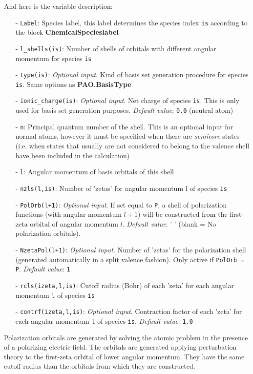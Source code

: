 \documentclass[11pt]{article}
\begin{document}
\begin{description}
\noindent
And here is the variable description:
\begin{itemize}
\item[-] {\tt Label}: Species label, this label determines 
the species index {\tt is} according to the block {\bf ChemicalSpecieslabel}
\item[-] {\tt l\_shells(is)}: Number of shells of orbitals 
with different angular momentum for species {\tt is}  
\item[-] {\tt type(is)}: {\it Optional input}.
Kind of basis set generation procedure for species {\tt is}. 
Same options as {\bf PAO.BasisType}
\item[-] {\tt ionic\_charge(is)}: {\it Optional input}. 
Net charge of species {\tt is}. This is  only used for
basis set generation purposes. {\it Default value}: {\tt 0.0} (neutral atom)
\item[-] {\tt n}: Principal quantum number of the shell. This is an optional 
input for normal atoms, however it must be specified when there are
{\it semicore} states (i.e. when states that usually are not 
considered to belong to the 
valence shell have been included in the calculation)
\item[-] {\tt l}: Angular momentum of 
basis orbitals of this shell
\item[-] {\tt nzls(l,is)}: Number of 'zetas' for angular 
momentum l of species {\tt is}
\item[-] {\tt PolOrb(l+1)}: {\it Optional input}. If set equal to {\tt P}, a 
shell of  
polarization functions (with angular momentum $l+1$)  will be constructed 
from the first-zeta orbital of angular momentum $l$. {\it Default value}: ' ' 
(blank = No polarization orbitals). 
\item[-] {\tt NzetaPol(l+1)}: {\it Optional input}. Number of
'zetas' for the 
polarization shell (generated automatically in a split valence fashion). 
Only active if {\tt PolOrb = P}. {\it Default value}: {\tt 1} 
\item[-] {\tt rcls(izeta,l,is)}: Cutoff radius (Bohr) of 
each 'zeta' for each angular momentum {\tt l} of species {\tt is}
\item[-] {\tt contrf(izeta,l,is)}: {\it Optional input}. 
Contraction factor of 
each 'zeta' for each angular momentum {\tt l} of species {\tt is}.
{\it Default value}: {\tt 1.0}
\end{itemize} 

Polarization orbitals are generated by solving the
atomic problem in the presence of a polarizing electric field. The
orbitals are generated applying perturbation theory to the first-zeta
orbital of lower angular momentum.  They have the same cutoff radius
than the orbitals from which they are constructed.


\end{description}
\end{document}
